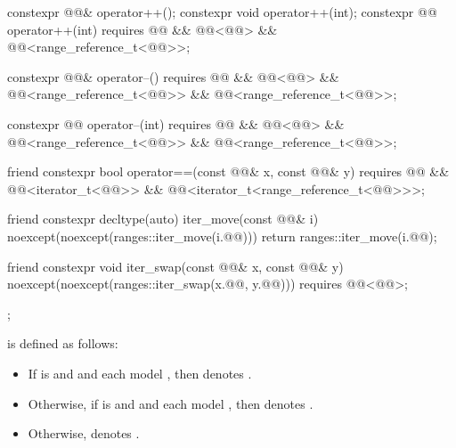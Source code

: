 \begin{codeblock}
{{    constexpr @@& operator++();
    constexpr void operator++(int);
    constexpr @@ operator++(int)
      requires @@ && @@<@@> &&
               @@<range_reference_t<@@>>;

    constexpr @@& operator--()
      requires @@ && @@<@@> &&
               @@<range_reference_t<@@>> &&
               @@<range_reference_t<@@>>;

    constexpr @@ operator--(int)
      requires @@ && @@<@@> &&
               @@<range_reference_t<@@>> &&
               @@<range_reference_t<@@>>;

    friend constexpr bool operator==(const @@& x, const @@& y)
      requires @@ && @@<iterator_t<@@>> &&
               @@<iterator_t<range_reference_t<@@>>>;

    friend constexpr decltype(auto) iter_move(const @@& i)
    noexcept(noexcept(ranges::iter_move(i.@@))) {
      return ranges::iter_move(i.@@);
    }

    friend constexpr void iter_swap(const @@& x, const @@& y)
      noexcept(noexcept(ranges::iter_swap(x.@@, y.@@)))
      requires @@<@@>;
  };
}
\end{codeblock}

\pnum
{} is defined as follows:
\begin{itemize}
\item If  is  and
   and  each model
  , then  denotes
  .
\item Otherwise, if  is  and
   and 
  each model , then  denotes
  .
\item Otherwise,  denotes .
\end{itemize}

